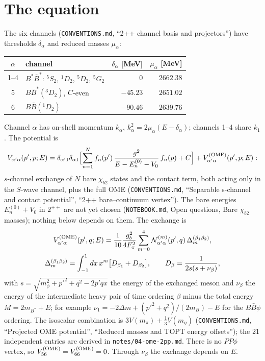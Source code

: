 \documentclass[11pt]{article}
\newcommand{\file}[1]{\nolinkurl{#1}}
\begin{document}
\section{The equation}\label{sec:equation}

The six channels (\file{CONVENTIONS.md}, ``2++ channel basis and projectors'') have thresholds $\delta_\alpha$ and reduced masses $\mu_\alpha$:
\begin{center}
\begin{tabular}{clrr}
\toprule
$\alpha$ & channel & $\delta_\alpha$ [MeV] & $\mu_\alpha$ [MeV]\\
\midrule
1--4 & $B^*\bar B^*$: $^5S_2$, $^1D_2$, $^5D_2$, $^5G_2$ & $0$ & $2662.38$\\
5 & $B\bar B^*(^3D_2)$, $C$-even & $-45.23$ & $2651.02$\\
6 & $B\bar B(^1D_2)$ & $-90.46$ & $2639.76$\\
\bottomrule
\end{tabular}
\end{center}
Channel $\alpha$ has on-shell momentum $k_\alpha$, $k_\alpha^2=2\mu_\alpha(E-\delta_\alpha)$; channels 1--4 share $k_1$. The potential is
\begin{equation}\label{eq:V}
V_{\alpha'\alpha}(p',p;E)=\delta_{\alpha'1}\delta_{\alpha1}\Bigl[\sum_{n=1}^{N}f_n(p')\,\frac{g^2}{E-E^{(0)}_n-V_0}\,f_n(p)+C\Bigr]+V^{\rm(OME)}_{\alpha'\alpha}(p',p;E):
\end{equation}
$s$-channel exchange of $N$ bare $\chi_{b2}$ states and the contact term, both acting only in the $S$-wave channel, plus the full OME (\file{CONVENTIONS.md}, ``Separable s-channel and contact potential'', ``2++ bare--continuum vertex''). The bare energies $E^{(0)}_n+V_0$ in $2^{++}$ are not yet chosen (\file{NOTEBOOK.md}, Open questions, Bare $\chi_{b2}$ masses); nothing below depends on them. The exchange is
\begin{gather}
V^{\rm(OME)}_{\alpha'\alpha}(p',q;E)=\frac1{10}\frac{g_b^2}{4F_\pi^2}\sum_{m=0}^{4}\mathcal N^{(m)}_{\alpha'\alpha}(p',q)\,\Delta^{(\beta_1\beta_2)}_m,\label{eq:VOME}\\
\Delta^{(\beta_1\beta_2)}_m=\int_{-1}^{1}dx\,x^m\bigl[D_{\beta_1}+D_{\beta_2}\bigr],\qquad
D_\beta=\frac{1}{2s(s+\nu_\beta)},\nonumber
\end{gather}
with $s=\sqrt{m_\phi^2+p'^2+q^2-2p'qx}$ the energy of the exchanged meson and $\nu_\beta$ the energy of the intermediate heavy pair of time ordering $\beta$ minus the total energy $M=2m_{B^*}+E$; for example $\nu_1=-2\Delta m+(p'^2+q^2)/(2m_B)-E$ for the $B\bar B\phi$ ordering. The isoscalar combination is $3V(m_\pi)+\frac13V(m_\eta)$ (\file{CONVENTIONS.md}, ``Projected OME potential'', ``Reduced masses and TOPT energy offsets''); the 21 independent entries are derived in \file{notes/04-ome-2pp.md}. There is no $PP\phi$ vertex, so $V^{\rm(OME)}_{56}=V^{\rm(OME)}_{66}=0$. Through $\nu_\beta$ the exchange depends on $E$.
\end{document}
